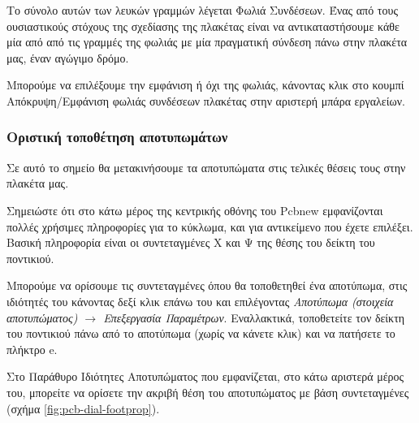 \documentclass[a4paper]{article}
\begin{document}
Το σύνολο αυτών των λευκών γραμμών λέγεται Φωλιά Συνδέσεων. Ένας από τους ουσιαστικούς στόχους της σχεδίασης της πλακέτας είναι να αντικαταστήσουμε κάθε μία από από τις γραμμές της φωλιάς με μία πραγματική σύνδεση πάνω στην πλακέτα μας, έναν αγώγιμο δρόμο. 

Μπορούμε να επιλέξουμε την εμφάνιση ή όχι της φωλιάς, κάνοντας κλικ στο κουμπί Απόκρυψη/Εμφάνιση φωλιάς συνδέσεων πλακέτας στην αριστερή μπάρα εργαλείων.


\subsubsection{Οριστική τοποθέτηση αποτυπωμάτων}

Σε αυτό το σημείο θα μετακινήσουμε τα αποτυπώματα στις τελικές θέσεις τους στην πλακέτα μας. 

Σημειώστε ότι στο κάτω μέρος της κεντρικής οθόνης του Pcbnew εμφανίζονται πολλές χρήσιμες πληροφορίες για το κύκλωμα, και για αντικείμενο που έχετε επιλέξει. Βασική πληροφορία είναι οι συντεταγμένες Χ και Ψ της θέσης του δείκτη του ποντικιού.

Μπορούμε να ορίσουμε τις συντεταγμένες όπου θα τοποθετηθεί ένα αποτύπωμα, στις ιδιότητές του κάνοντας δεξί κλικ επάνω του και επιλέγοντας \textit{Αποτύπωμα (στοιχεία αποτυπώματος) $\rightarrow$ Επεξεργασία Παραμέτρων}. Εναλλακτικά, τοποθετείτε τον δείκτη του ποντικιού πάνω από το αποτύπωμα (χωρίς να κάνετε κλικ) και να πατήσετε το πλήκτρο e.

Στο Παράθυρο Ιδιότητες Αποτυπώματος που εμφανίζεται, στο κάτω αριστερά μέρος του, μπορείτε να ορίσετε την ακριβή θέση του αποτυπώματος με βάση συντεταγμένες (σχήμα \ref{fig:pcb-dial-footprop}).
\end{document}
